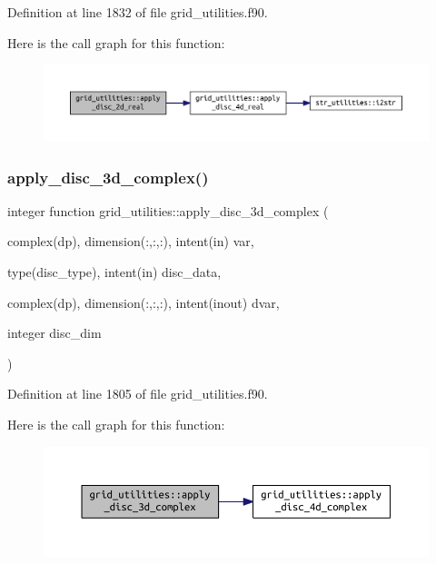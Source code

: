 Definition at line 1832 of file grid\+\_\+utilities.\+f90.

Here is the call graph for this function\+:
\nopagebreak
\begin{figure}[H]
\begin{center}
\leavevmode
\includegraphics[width=350pt]{namespacegrid__utilities_a9ffa0404a239305f4c0c577d1e34a791_cgraph}
\end{center}
\end{figure}
\mbox{\label{namespacegrid__utilities_a2e42ad0b765c9292bc7010069359cc28}} 
\subsubsection{\texorpdfstring{apply\+\_\+disc\+\_\+3d\+\_\+complex()}{apply\_disc\_3d\_complex()}}
{\footnotesize\ttfamily integer function grid\+\_\+utilities\+::apply\+\_\+disc\+\_\+3d\+\_\+complex (\begin{DoxyParamCaption}\item[{complex(dp), dimension(\+:,\+:,\+:), intent(in)}]{var,  }\item[{type(disc\+\_\+type), intent(in)}]{disc\+\_\+data,  }\item[{complex(dp), dimension(\+:,\+:,\+:), intent(inout)}]{dvar,  }\item[{integer}]{disc\+\_\+dim }\end{DoxyParamCaption})}



Definition at line 1805 of file grid\+\_\+utilities.\+f90.

Here is the call graph for this function\+:
\nopagebreak
\begin{figure}[H]
\begin{center}
\leavevmode
\includegraphics[width=350pt]{namespacegrid__utilities_a2e42ad0b765c9292bc7010069359cc28_cgraph}
\end{center}
\end{figure}
\mbox{\label{namespacegrid__utilities_a876f338471e643a680893b9a19715016}} 
